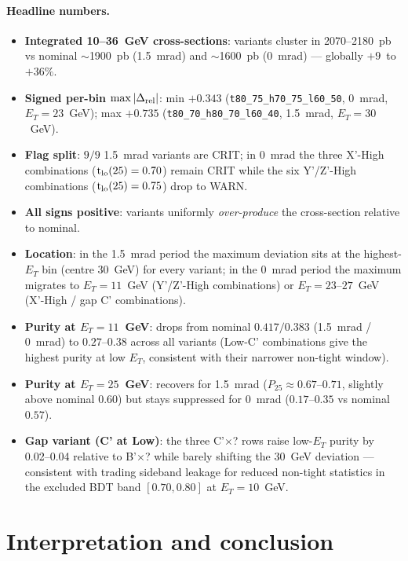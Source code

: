 \documentclass[11pt]{article}
\begin{document}
\paragraph{Headline numbers.}
\begin{itemize}
\item \textbf{Integrated 10--36~GeV cross-sections}: variants cluster in
      2070--2180~pb vs nominal $\sim$1900~pb (1.5~mrad) and $\sim$1600~pb
      (0~mrad) — globally $+9$~to~$+36\%$.
\item \textbf{Signed per-bin $\max|\Delta_{\rm rel}|$}: min $+0.343$
      (\texttt{t80\_75\_h70\_75\_l60\_50}, 0~mrad, $E_T = 23$~GeV);
      max $+0.735$ (\texttt{t80\_70\_h80\_70\_l60\_40}, 1.5~mrad,
      $E_T = 30$~GeV).
\item \textbf{Flag split}: $9/9$ 1.5~mrad variants are \textsc{CRIT};
      in 0~mrad the three X'-High combinations ($\mathrm{t}_{\rm lo}(25)
      = 0.70$) remain \textsc{CRIT} while the six Y'/Z'-High
      combinations ($\mathrm{t}_{\rm lo}(25) = 0.75$) drop to
      \textsc{WARN}.
\item \textbf{All signs positive}: variants uniformly \emph{over-produce}
      the cross-section relative to nominal.
\item \textbf{Location}: in the 1.5~mrad period the maximum deviation
      sits at the highest-$E_T$ bin (centre 30~GeV) for every variant;
      in the 0~mrad period the maximum migrates to $E_T = 11$~GeV
      (Y'/Z'-High combinations) or $E_T = 23$--$27$~GeV (X'-High /
      gap C' combinations).
\item \textbf{Purity at $E_T = 11$~GeV}: drops from nominal
      $0.417 / 0.383$ (1.5~mrad / 0~mrad) to $0.27$--$0.38$ across all
      variants (Low-C' combinations give the highest purity at low
      $E_T$, consistent with their narrower non-tight window).
\item \textbf{Purity at $E_T = 25$~GeV}: recovers for 1.5~mrad
      ($P_{25} \approx 0.67$--$0.71$, slightly above nominal $0.60$) but
      stays suppressed for 0~mrad ($0.17$--$0.35$ vs nominal $0.57$).
\item \textbf{Gap variant (C' at Low)}: the three C'$\times$? rows
      raise low-$E_T$ purity by 0.02--0.04 relative to B'$\times$? while
      barely shifting the $30$~GeV deviation — consistent with trading
      sideband leakage for reduced non-tight statistics in the excluded
      BDT band $[0.70, 0.80]$ at $E_T = 10$~GeV.
\end{itemize}

\section{Interpretation and conclusion}
\end{document}
